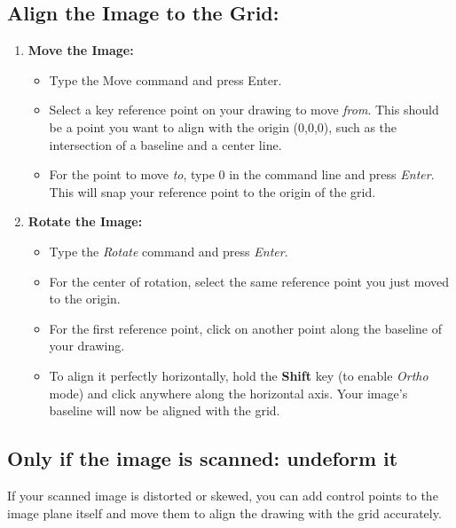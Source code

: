 \documentclass{article}
\begin{document}
\subsection{Align the Image to the Grid:}

\begin{enumerate}
\item \textbf{Move the Image:}

\begin{itemize}
\item Type the Move command and press Enter.
\item Select a key reference point on your drawing to move \textit{from}. This should be a point you want to align with the origin (0,0,0), such as the intersection of a baseline and a center line.
\item For the point to move \textit{to}, type 0 in the command line and press \textit{Enter}. This will snap your reference point to the origin of the grid.
\end{itemize}


\item \textbf{Rotate the Image:}

\begin{itemize}
\item Type the \textit{Rotate} command and press \textit{Enter}.
\item For the center of rotation, select the same reference point you just moved to the origin.
\item For the first reference point, click on another point along the baseline of your drawing.
\item To align it perfectly horizontally, hold the \textbf{Shift} key (to enable \textit{Ortho} mode) and click anywhere along the horizontal axis. Your image's baseline will now be aligned with the grid.
\end{itemize}
\end{enumerate}

\subsection{Only if the image is scanned: undeform it}

If your scanned image is distorted or skewed, you can add control points to the image plane itself and move them to align the drawing with the grid accurately.
\end{document}
